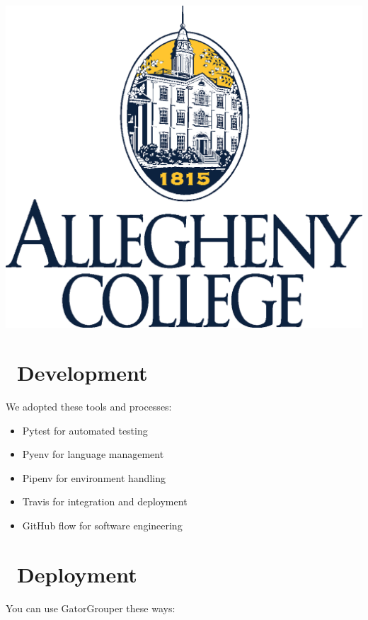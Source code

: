 \documentclass[a0paper,fleqn]{betterposter}
\begin{document}
{  \includegraphics[width=\textwidth]{img/CollegeLogo.eps}\\

  }{


  \vspace*{-.5in}
  \section{\faCodeFork~Development}
  We adopted these tools and processes:\\
  \vspace*{-.5in}
  \begin{itemize}[leftmargin=*]

    \item{Pytest for automated testing}
    \item{Pyenv for language management}
    \item{Pipenv for environment handling}
    \item{Travis for integration and deployment}
    \item{GitHub flow for software engineering}

  \end{itemize}

  \section{\faCloudUpload~Deployment}
  You can use GatorGrouper these ways:\\
  \vspace*{-.5in}
  \begin{itemize}[leftmargin=*]


\end{itemize}}
\end{document}
